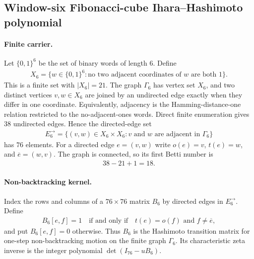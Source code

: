 
\subsection{Window-six Fibonacci-cube Ihara--Hashimoto polynomial}
\label{subsec:window6-fibonacci-cube-ihara-zeta}

\paragraph{Finite carrier.}
Let $\{0,1\}^6$ be the set of binary words of length $6$. Define
$$
\begin{aligned}
X_6=\{w\in\{0,1\}^6 : \text{no two adjacent coordinates of }w\text{ are both }1\}.
\end{aligned}
$$
This is a finite set with $|X_6|=21$. The graph $\Gamma_6$ has vertex set $X_6$, and two distinct vertices $v,w\in X_6$ are joined by an undirected edge exactly when they differ in one coordinate. Equivalently, adjacency is the Hamming-distance-one relation restricted to the no-adjacent-ones words. Direct finite enumeration gives $38$ undirected edges. Hence the directed-edge set
$$
\begin{aligned}
E_6^{\rightarrow}=\{(v,w)\in X_6\times X_6 : v\text{ and }w\text{ are adjacent in }\Gamma_6\}
\end{aligned}
$$
has $76$ elements. For a directed edge $e=(v,w)$ write $o(e)=v$, $t(e)=w$, and $\overline e=(w,v)$. The graph is connected, so its first Betti number is
$$
\begin{aligned}
38-21+1=18.
\end{aligned}
$$

\paragraph{Non-backtracking kernel.}
Index the rows and columns of a $76\times 76$ matrix $B_6$ by directed edges in $E_6^{\rightarrow}$. Define
$$
\begin{aligned}
B_6[e,f]=1
\quad\text{if and only if}\quad
 t(e)=o(f)\text{ and }f\ne \overline e,
\end{aligned}
$$
and put $B_6[e,f]=0$ otherwise. Thus $B_6$ is the Hashimoto transition matrix for one-step non-backtracking motion on the finite graph $\Gamma_6$. Its characteristic zeta inverse is the integer polynomial $\det(I_{76}-uB_6)$.

